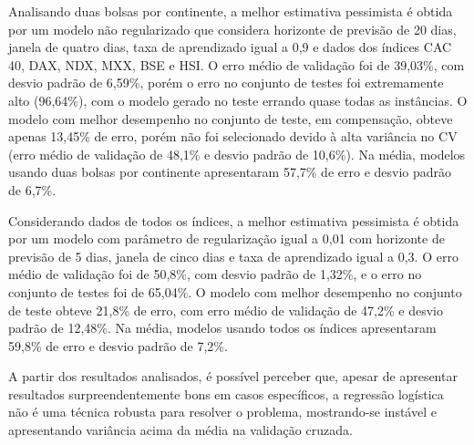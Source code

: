 \documentclass[12pt,a4paper,utf8]{ppgsi}
\begin{document}
            Analisando duas bolsas por continente, a melhor estimativa pessimista é obtida por um modelo não regularizado que considera horizonte de previsão de 20 dias, janela de quatro dias, taxa de aprendizado igual a 0,9 e dados dos índices CAC 40, DAX, NDX, MXX, BSE e HSI. O erro médio de validação foi de 39,03\%, com desvio padrão de 6,59\%, porém o erro no conjunto de testes foi extremamente alto (96,64\%), com o modelo gerado no teste errando quase todas as instâncias. O modelo com melhor desempenho no conjunto de teste, em compensação, obteve apenas 13,45\% de erro, porém não foi selecionado devido à alta variância no CV (erro médio de validação de 48,1\% e desvio padrão de 10,6\%). Na média, modelos usando duas bolsas por continente apresentaram 57,7\% de erro e desvio padrão de 6,7\%.

            Considerando dados de todos os índices, a melhor estimativa pessimista é obtida por um modelo com parâmetro de regularização igual a 0,01 com horizonte de previsão de 5 dias, janela de cinco dias e taxa de aprendizado igual a 0,3. O erro médio de validação foi de 50,8\%, com desvio padrão de 1,32\%, e o erro no conjunto de testes foi de 65,04\%. O modelo com melhor desempenho no conjunto de teste obteve 21,8\% de erro, com erro médio de validação de 47,2\% e desvio padrão de 12,48\%. Na média, modelos usando todos os índices apresentaram 59,8\% de erro e desvio padrão de 7,2\%.
						
            A partir dos resultados analisados, é possível perceber que, apesar de apresentar resultados surpreendentemente bons em casos específicos, a regressão logística não é uma técnica robusta para resolver o problema, mostrando-se instável e apresentando variância acima da média na validação cruzada.

\end{document}

